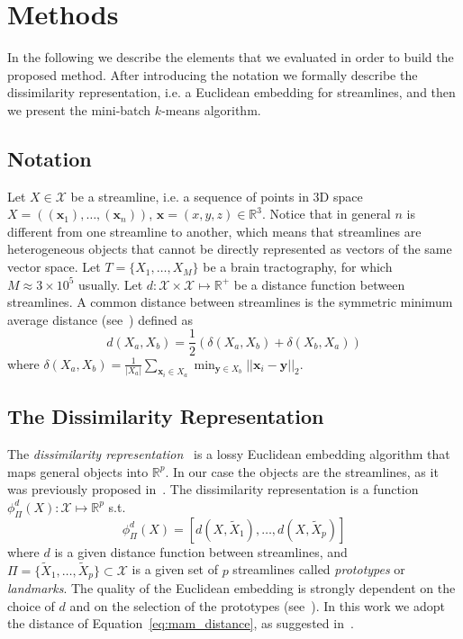 \section{Methods}
\label{sec:methods}
In the following we describe the elements that we evaluated in order
to build the proposed method. After introducing the notation we
formally describe the dissimilarity representation, i.e. a Euclidean
embedding for streamlines, and then we present the mini-batch
$k$-means algorithm.  

\subsection{Notation}
\label{sec:notation}
Let $X \in \mathcal{X}$ be a streamline, i.e. a sequence of points in
$3$D space $X = \left((\mathbf{x}_1),\ldots,(\mathbf{x}_n)\right)$,
$\mathbf{x} = (x,y,z) \in \mathbb{R}^3$. Notice that in general $n$ is
different from one streamline to another, which means that streamlines
are heterogeneous objects that cannot be directly represented as
vectors of the same vector space. Let $T = \{X_1,\ldots,X_M\}$ be a
brain tractography, for which $M \approx 3 \times 10^5$ usually. Let
$d:\mathcal{X} \times \mathcal{X} \mapsto \mathbb{R}^+$ be a distance
function between streamlines. A common distance between streamlines is
the symmetric minimum average distance
(see~\cite{zhang2008identifying}) defined as 
\begin{equation}
  \label{eq:mam_distance}
  d(X_a,X_b) = \frac{1}{2}(\delta(X_a,X_b) + \delta(X_b,X_a))
\end{equation}
where $\delta(X_a,X_b) = \frac{1}{|X_a|} \sum_{\mathbf{x}_i \in X_a}
\min_{\mathbf{y} \in X_b} ||\mathbf{x}_i - \mathbf{y}||_2$.



\subsection{The Dissimilarity Representation}
\label{sec:dissimilarity}
The \emph{dissimilarity representation}~\cite{pekalska2002generalized}
is a lossy Euclidean embedding algorithm that maps general objects
into $\mathbb{R}^p$. In our case the objects are the streamlines, as
it was previously proposed in~\cite{olivetti2012approximation}. The
dissimilarity representation is a function
$\phi_{\Pi}^d(X):\mathcal{X} \mapsto \mathbb{R}^p$ s.t.
\begin{equation}
  \phi_{\Pi}^d(X) = [d(X,\tilde{X}_1) ,\ldots, d(X,\tilde{X}_p)]
\label{eq:dissimilarity_representation}
\end{equation}
where $d$ is a given distance function between streamlines, and $\Pi =
\{\tilde{X}_1, \ldots, \tilde{X}_p\} \subset \mathcal{X}$ is a given
set of $p$ streamlines called \emph{prototypes} or
\emph{landmarks}. The quality of the Euclidean embedding is strongly
dependent on the choice of $d$ and on the selection of the prototypes
(see~\cite{pekalska2006prototype,olivetti2012approximation}). In this
work we adopt the distance of Equation~\ref{eq:mam_distance}, as
suggested in~\cite{olivetti2012approximation}.

